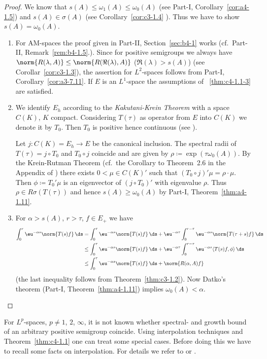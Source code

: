 \begin{proof}
We know that $s(A) \leq \omega_{1}(A) \leq \omega_{0}(A)$ (see Part-I, Corollary~\ref{cor:a4-1.5}) and $s(A) \in \sigma(A)$ (see Corollary~\ref{cor:c3-1.4} ).
Thus we have to show $s(A) = \omega_{0}(A)$.

\begin{enumerate}[\upshape (i), wide, labelindent=.25em]
\item 
For AM-spaces the proof given in Part-II, Section~\ref{sec:b4-1} works (cf.\ Part-II, Remark~\ref{rem:b4-1.5}.).
Since for positive semigroups we always have $\norm{R(\lambda,A)} \leq \norm{R(\Re(\lambda), A)}$ ($\Re(\lambda) > s(A)$) (see   Corollar~\ref{cor:c3-1.3}), the assertion for $L^{2}$-spaces follows from Part-I, Corollary~\ref{cor:a3-7.11}.
If\/ $E$ is an $L^{1}$-space the assumptions of ~\ref{thm:c4-1.1-3} are satisfied.

\item 
We identify $E_{h}$ according to the \emph{Kakutani-Krein Theorem} with a space $C(K)$, $K$ compact.
Considering $T(\tau)$ as operator from $E$ into $C(K)$ we denote it by $T_{0}$.
Then $T_{0}$ is positive hence continuous (see \textcite[Theorem~5.3]{schaefer:1974}).

Let $j \colon C(K) = E_{h} \to E$ be the canonical inclusion.
The spectral radii of\/ $T(\tau) = j \circ T_{0}$ and $T_{0} \circ j$ coincide and are given by $\rho \coloneq  \exp(\tau \omega_{0}(A))$.
By the Krein-Rutman Theorem (cf.\ the Corollary to Theorem~2.6 in the Appendix of \textcite{schaefer:1966}) there exists $0 < \mu \in C(K)'$ such that $(T_{0} \circ j)'\mu = \rho \cdot \mu$.
Then $\phi \coloneq  T_{0}'\mu$ is an eigenvector of\/ $(j \circ T_{0})'$ with eigenvalue $\rho$.
Thus $\rho \in R\sigma(T(\tau))$ and hence $s(A) \geq \omega_{0}(A)$ by Part-I, Theorem~\ref{thm:a4-1.11}.

\item
For $\alpha > s(A)$, $r > \tau$, $f \in E_{+}$ we have
\begin{align*}
\int_{0}^{r} \eu^{-\alpha s}\norm{T(s)f} \, \ds &= \int_{0}^{\tau} \eu^{-\alpha s}\norm{T(s)f} \, \ds + \eu^{-\alpha \tau}\int_{0}^{r-\tau} \eu^{-\alpha s}\norm{T(\tau+s)f} \, \ds \\
&\leq \int_{0}^{\tau} \eu^{-\alpha s}\norm{T(s)f} \, \ds + \eu^{-\alpha \tau}\int_{0}^{r-\tau} \eu^{-\alpha s}\langle T(s)f,\phi \rangle \, \ds \\
&\leq \int_{0}^{\tau} \eu^{-\alpha s}\norm{T(s)f} \, \ds + \norm{R(\alpha,A)f}
\end{align*}
(the last inequality follows from Theorem~\ref{thm:c3-1.2}).
Now Datko's theorem (Part-I, Theorem~\ref{thm:a4-1.11}) implies $\omega_{0}(A) < \alpha$.
\end{enumerate}
\end{proof}
For $L^{p}$-spaces, $p \neq 1$, $2$, $\infty$, it is not known whether spectral- and growth bound of an arbitrary positive semigroup coincide.
Using interpolation techniques and  Theorem~\ref{thm:c4-1.1}  one can treat some special cases.
Before doing this we have to recall some facts on interpolation.
For details we refer to 
\textcite[VI.10]{dunfordschwartz:1958} or \textcite[IX.4.]{reedsimon:1975}.

